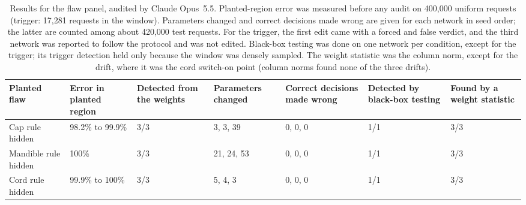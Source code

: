 \documentclass[aps,prx,reprint,superscriptaddress,nofootinbib]{revtex4-2}
\newlength{\tblw}
\begin{document}
\begin{table}[tp]
\caption{Results for the flaw panel, audited by Claude Opus~5.5. Planted-region error was measured before any
audit on 400,000 uniform requests (trigger: 17,281 requests in the window). Parameters changed and
correct decisions made wrong are given for each network in seed order; the latter are counted among
about 420,000 test requests. For the trigger, the first edit came with a forced and false verdict,
and the third network was reported to follow the protocol and was not edited. Black-box testing was
done on one network per condition, except for the trigger; its trigger detection held only because
the window was densely sampled. The weight statistic was the column norm, except for the drift,
where it was the cord switch-on point (column norms found none of the three drifts).}\label{tbl:panel}
\small
\setlength{\tabcolsep}{4.5pt}
\setlength{\tblw}{\dimexpr\hsize-14\tabcolsep\relax}
\begin{ruledtabular}
\begin{tabular}{lllllll}
\parbox[b]{0.2940\tblw}{\raggedright\strut Planted flaw\strut} & \parbox[b]{0.1377\tblw}{\raggedright\strut Error in planted region\strut} & \parbox[b]{0.1838\tblw}{\raggedright\strut Detected from the weights\strut} & \parbox[b]{0.0942\tblw}{\raggedright\strut Parameters changed\strut} & \parbox[b]{0.1060\tblw}{\raggedright\strut Correct decisions made wrong\strut} & \parbox[b]{0.1025\tblw}{\raggedright\strut Detected by black-box testing\strut} & \parbox[b]{0.0815\tblw}{\raggedright\strut Found by a weight statistic\strut} \\
\hline
\parbox[t]{0.2940\tblw}{\raggedright\strut Cap rule hidden\strut} & \parbox[t]{0.1377\tblw}{\raggedright\strut 98.2\% to 99.9\%\strut} & \parbox[t]{0.1838\tblw}{\raggedright\strut 3/3\strut} & \parbox[t]{0.0942\tblw}{\raggedright\strut 3, 3, 39\strut} & \parbox[t]{0.1060\tblw}{\raggedright\strut 0, 0, 0\strut} & \parbox[t]{0.1025\tblw}{\raggedright\strut 1/1\strut} & \parbox[t]{0.0815\tblw}{\raggedright\strut 3/3\strut} \\
\parbox[t]{0.2940\tblw}{\raggedright\strut Mandible rule hidden\strut} & \parbox[t]{0.1377\tblw}{\raggedright\strut 100\%\strut} & \parbox[t]{0.1838\tblw}{\raggedright\strut 3/3\strut} & \parbox[t]{0.0942\tblw}{\raggedright\strut 21, 24, 53\strut} & \parbox[t]{0.1060\tblw}{\raggedright\strut 0, 0, 0\strut} & \parbox[t]{0.1025\tblw}{\raggedright\strut 1/1\strut} & \parbox[t]{0.0815\tblw}{\raggedright\strut 3/3\strut} \\
\parbox[t]{0.2940\tblw}{\raggedright\strut Cord rule hidden\strut} & \parbox[t]{0.1377\tblw}{\raggedright\strut 99.9\% to 100\%\strut} & \parbox[t]{0.1838\tblw}{\raggedright\strut 3/3\strut} & \parbox[t]{0.0942\tblw}{\raggedright\strut 5, 4, 3\strut} & \parbox[t]{0.1060\tblw}{\raggedright\strut 0, 0, 0\strut} & \parbox[t]{0.1025\tblw}{\raggedright\strut 1/1\strut} & \parbox[t]{0.0815\tblw}{\raggedright\strut 3/3\strut} \\

\end{tabular}
\end{ruledtabular}
\end{table}
\end{document}
